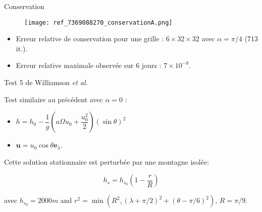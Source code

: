 \documentclass[11pt]{beamer}
\begin{document}
\begin{frame}{Conservation}
\begin{figure}
\texttt{[image: ref\_7369088270\_conservationA.png]}
\end{figure}
\begin{itemize}
\item Erreur relative de conservation pour une grille : $6 \times 32 \times 32$ avec $\alpha=\pi/4$ (713 it.).
\item Erreur relative maximale observée sur 6 jours : $7 \times 10^{-9}$.
\end{itemize}
\end{frame}






























\begin{frame}{Test 5 de Williamson \textit{et al.}}

\begin{exampleblock}{}
Test similaire au précédent avec $\alpha = 0$ :

\begin{itemize}
\item $h = h_0 - \dfrac{1}{g} \left( a \Omega u_0 + \dfrac{u_0^2}{2} \right)(\sin \theta)^2$
\item $\mathbf{u} = u_0 \cos \theta \mathbf{e}_{\lambda}$.
\end{itemize}

Cette solution stationnaire est perturbée par une montagne isolée:

$$h_s = h_{s_0} \left( 1 - \dfrac{r}{R} \right)$$

avec $h_{s_0}=2000m$ and $r^2=\min(R^2, (\lambda + \pi/2)^2+(\theta - \pi/6)^2)$, $R=\pi/9$.
\end{exampleblock}
\end{frame}
\end{document}
